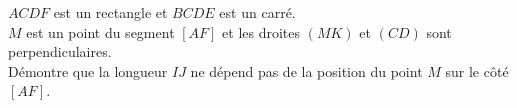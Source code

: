
$ACDF$ est un rectangle et $BCDE$ est un carré.\\
 
$M$ est un point du segment $[AF]$ et les droites $(MK)$ et $(CD)$
sont perpendiculaires.\\
 
Démontre que la longueur $IJ$ ne dépend pas de la position du point
$M$ sur le côté $[AF]$.
 